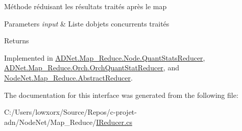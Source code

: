Méthode réduisant les résultats traités après le map 


\begin{DoxyParams}{Parameters}
{\em input} & Liste d\textquotesingle{}objets concurrents traités\\
\hline
\end{DoxyParams}
\begin{DoxyReturn}{Returns}

\end{DoxyReturn}


Implemented in \hyperlink{class_a_d_net_1_1_map___reduce_1_1_node_1_1_quant_stats_reducer_a315cd41c2ab48fbf409d16389977c679}{A\+D\+Net.\+Map\+\_\+\+Reduce.\+Node.\+Quant\+Stats\+Reducer}, \hyperlink{class_a_d_net_1_1_map___reduce_1_1_orch_1_1_orch_quant_stat_reducer_a8fbc2655df6b1f0e8943107f195a01b0}{A\+D\+Net.\+Map\+\_\+\+Reduce.\+Orch.\+Orch\+Quant\+Stat\+Reducer}, and \hyperlink{class_node_net_1_1_map___reduce_1_1_abstract_reducer_aad995166ff8f13b4c85338bc29d09e62}{Node\+Net.\+Map\+\_\+\+Reduce.\+Abstract\+Reducer}.



The documentation for this interface was generated from the following file\+:\begin{DoxyCompactItemize}
\item 
C\+:/\+Users/lowxorx/\+Source/\+Repos/c-\/projet-\/adn/\+Node\+Net/\+Map\+\_\+\+Reduce/\hyperlink{_i_reducer_8cs}{I\+Reducer.\+cs}\end{DoxyCompactItemize}
